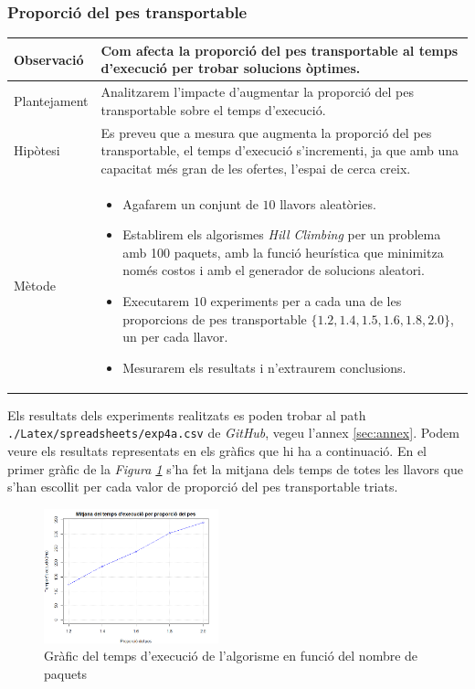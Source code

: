 \documentclass[a4paper]{article}
\begin{document}
	\subsubsection{Proporció del pes transportable}
	\begin{table}[ht]
		\centering
		\begin{tabular}{|l|p{10cm}|}
			\hline
			Observació & Com afecta la proporció del pes transportable al temps d'execució per trobar solucions òptimes.\\
			\hline
			Plantejament & Analitzarem l'impacte d'augmentar la proporció del pes transportable sobre el temps d'execució. \\
			\hline
			Hipòtesi & Es preveu que a mesura que augmenta la proporció del pes transportable, el temps d'execució s'incrementi, ja que amb una capacitat més gran de les ofertes, l'espai de cerca creix.\\
			\hline
			Mètode &
			\begin{itemize}
				\item Agafarem un conjunt de $10$ llavors aleatòries.
				\item Establirem els algorismes \textit{Hill Climbing} per un problema amb 100 paquets, amb la funció heurística que minimitza només costos i amb el generador de solucions aleatori.
				\item Executarem $10$ experiments per a cada una de les proporcions de pes transportable $\{1.2, 1.4, 1.5, 1.6, 1.8, 2.0 \}$, un per cada llavor.
				\item Mesurarem els resultats i n'extraurem conclusions.
			\end{itemize} \\
			\hline
		\end{tabular}
		\label{tab:exp4a_apartats}
	\end{table}
	
	Els resultats dels experiments realitzats es poden trobar al path \texttt{./Latex/spreadsheets/exp4a.csv} de \textit{GitHub}, vegeu l'annex \ref{sec:annex}. Podem veure els resultats representats en els gràfics que hi ha a continuació. En el primer gràfic de la \textit{Figura \ref{fig:exp4a_grafic_lineal}} s'ha fet la mitjana dels temps de totes les llavors que s'han escollit per cada valor de proporció del pes transportable triats.
	
	\begin{figure}[H]
		\centering
		\includegraphics[width=0.45\textwidth]{images/exp4a_grafic_lineal.png}
		\caption{Gràfic del temps d'execució de l'algorisme en funció del nombre de paquets}
		\label{fig:exp4a_grafic_lineal}
	\end{figure}
	
\end{document}
